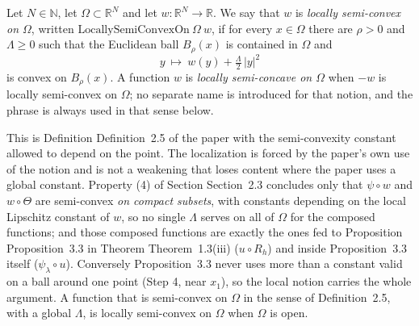 \begin{definition}
Let $N\in\mathbb N$, let $\Omega\subset\mathbb R^N$ and let $w:\mathbb R^N\to\mathbb R$.
We say that $w$ is \emph{locally semi-convex on $\Omega$}, written
$\mathrm{LocallySemiConvexOn}\ \Omega\ w$, if for every $x\in\Omega$ there are $\rho>0$ and
$\Lambda\ge0$ such that the Euclidean ball $B_\rho(x)$ is contained in $\Omega$ and
\[
 y\ \longmapsto\ w(y)+\tfrac{\Lambda}{2}\,|y|^{2}
\]
is convex on $B_\rho(x)$. A function $w$ is \emph{locally semi-concave on $\Omega$} when
$-w$ is locally semi-convex on $\Omega$; no separate name is introduced for that notion,
and the phrase is always used in that sense below.

This is Definition Definition~2.5 of the paper with the semi-convexity constant allowed to
depend on the point. The localization is forced by the paper's own use of the notion and
is not a weakening that loses content where the paper uses a global constant. Property (4)
of Section Section~2.3 concludes only that $\psi\circ w$ and $w\circ\Theta$ are
semi-convex \emph{on compact subsets}, with constants depending on the local Lipschitz
constant of $w$, so no single $\Lambda$ serves on all of $\Omega$ for the composed
functions; and those composed functions are exactly the ones fed to Proposition
Proposition~3.3 in Theorem Theorem~1.3(iii) ($u\circ R_h$) and inside Proposition~3.3 itself
($\psi_\lambda\circ u$). Conversely Proposition~3.3 never uses more than a constant valid on a
ball around one point (Step 4, near $x_1$), so the local notion carries the whole
argument. A function that is semi-convex on $\Omega$ in the sense of Definition~2.5, with a
global $\Lambda$, is locally semi-convex on $\Omega$ when $\Omega$ is open.
\end{definition}
